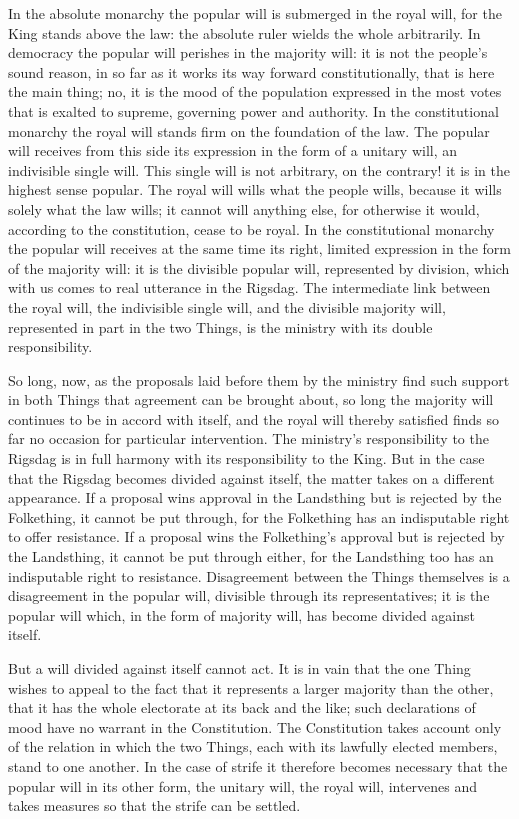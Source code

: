 \documentclass[12pt,a4paper,openany]{book}
\newcommand{\opage}[1]{\marginnote{\footnotesize\textit{[#1]}}}
\begin{document}
In the absolute monarchy the popular will is submerged
in the royal will, for the King stands above the law: the absolute
ruler wields the whole arbitrarily. In democracy
the popular will perishes in the majority will:
it is not the people's sound reason, in so far as it
works its way forward constitutionally, that is here the main thing;
no, it is the mood of the population expressed
in the most votes that is exalted to supreme, governing
power and authority. In the constitutional monarchy
the royal will stands firm on the foundation of the law.
The popular will receives from this side its expression in the form of
a unitary will, an indivisible single will. This single will
is not arbitrary, on the contrary! it is in the highest sense
popular. The royal will wills what the people
wills, because it wills solely what the law wills; it cannot
will anything else, for otherwise it would, according to the constitution,
cease to be royal. In the constitutional
monarchy the popular will receives at the same time its right, limited
expression in the form of the majority will: it is the divisible
popular will, represented by division, which with us
comes to real utterance in the Rigsdag. The intermediate link
between the royal will, the indivisible single will,
and the divisible majority will, represented in part in the two Things,
is the ministry with its double responsibility.

So long, now, as the proposals laid before them by the ministry
find such support in both Things that agreement
can be brought about, so long the majority will continues
to be in accord with itself, and the royal will thereby
satisfied finds so far no
occasion for particular intervention. The ministry's
\setcounter{footnote}{0}%
\opage{13}responsibility to the Rigsdag is in full harmony with its responsibility
to the King. But in the case that the Rigsdag
becomes divided against itself, the matter takes on a different
appearance. If a proposal wins approval in the Landsthing
but is rejected by the Folkething, it cannot be put
through, for the Folkething has an indisputable right to
offer resistance. If a proposal wins the Folkething's
approval but is rejected by the Landsthing, it cannot
be put through either, for the Landsthing too has an
indisputable right to resistance. Disagreement between the Things
themselves is a disagreement in the popular will, divisible
through its representatives; it is the popular will which,
in the form of majority will, has become divided against
itself.

But a will divided against itself cannot
act. It is in vain that the one Thing wishes to appeal
to the fact that it represents a larger majority than the
other, that it has the whole electorate at its back and the like;
such declarations of mood have no warrant in the Constitution.
The Constitution takes account only of the relation
in which the two Things, each with its lawfully elected members,
stand to one another. In the case
of strife it therefore becomes necessary that the popular will
in its other form, the unitary will, the royal
will, intervenes and takes measures so that
the strife can be settled.
\end{document}
